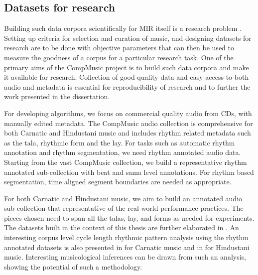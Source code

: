 \subsection{Datasets for research}\label{sec:probdef:thesisdatasets}
Building such data corpora scientifically for \gls{MIR} itself is a research problem \cite{serra:14:corpus,peeters:12:corpus}. Setting up criteria for selection and curation of music, and designing datasets for research are to be done with objective parameters that can then be used to measure the goodness of a corpus for a particular research task. One of the primary aims of the CompMusic project is to build such data corpora and make it available for research. Collection of good quality data and easy access to both audio and metadata is essential for reproducibility of research and to further the work presented in the dissertation.

For developing algorithms, we focus on commercial quality audio from CDs, with manually edited metadata. The CompMusic audio collection is comprehensive for both Carnatic and Hindustani music and includes rhythm related metadata such as the \gls{tala}, rhythmic form and the \gls{lay}. For tasks such as automatic rhythm annotation and rhythm segmentation, we need rhythm annotated audio data. Starting from the vast CompMusic collection, we build a representative rhythm annotated sub-collection with beat and \gls{sama} level annotations. For rhythm based segmentation, time aligned segment boundaries are needed as appropriate. 

For both Carnatic and Hindustani music, we aim to build an annotated audio sub-collection that representative of the real world performance practices. The pieces chosen need to span all the \glspl{tala}, lay, and forms as needed for experiments. The datasets built in the context of this thesis are further elaborated in . An interesting corpus level cycle length rhythmic pattern analysis using the rhythm annotated datasets is also presented in  for Carnatic music and in  for Hindustani music. Interesting musicological inferences can be drawn from such an analysis, showing the potential of such a methodology. 
%

